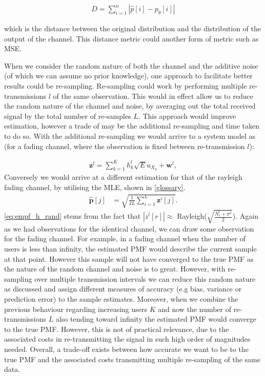 \documentclass{article}
\begin{document}
\begin{align}
    D = \sum_{i=1}^n |\hat{p}[i] - p_{\theta}[i]|
\end{align}

which is the distance between the original distribution and the distribution of the output of the channel. This distance metric could another form of metric such as \ac{MSE}. 

When we consider the random nature of both the channel and the additive noise (of which we can assume no prior knowledge), one approach to facilitate better results could be re-sampling. Re-sampling could work by performing multiple re-transmissions $l$ of the same observation. This would in effect allow us to reduce the random nature of the channel and noise, by averaging out the total received signal by the total number of re-samples $L$. This approach would improve estimation, however a trade of may be the additional re-sampling and time taken to do so. With the additional re-sampling we would arrive to a system model as (for a fading channel, where the observation is fixed between re-transmission $l$):

\begin{align}
    \boldsymbol{z}^l = \sum_{k=1}^K h_k^l  \sqrt{E}u_{X_k} + \boldsymbol{w}^l, \label{eq:system_model_retrans}
\end{align}
Conversely we would arrive at a different estimation for that of the rayleigh fading channel, by utilising the \ac{MLE}, shown in \cref{glossary}.
\begin{align}
    \boldsymbol{\hat{p}}[j] &= \sqrt{\frac{1}{2L} \sum_{i = 1}^{L}\boldsymbol{z}^i[j]}.\label{eq:empf_h_rand}
\end{align}
\cref{eq:empf_h_rand} stems from the fact that $|z^l[r]| \approx$ Rayleigh($\sqrt{\frac{N_{r}^l + \sigma^2}{2}}$). Again as we had observations for the identical channel, we can draw some observation for the fading channel. For example, in a fading channel when the number of users is less than infinity, the estimated \ac{PMF} would describe the current sample at that point. However this sample will not have converged to the true \ac{PMF} as the nature of the random channel and noise is to great. However, with re-sampling over multiple transmission intervals we can reduce this random nature as discussed and assign different measures of accuracy (e.g bias, variance or prediction error) to the sample estimates.
Moreover, when we combine the previous behaviour regarding increasing users $K$ and now the number of re-transmissions $L$ also tending toward infinity the estimated \ac{PMF} would converge to the true \ac{PMF}. However, this is not of practical relevance, due to the associated costs in re-transmitting the signal in such high order of magnitudes needed. Overall, a trade-off exists between how accurate we want to be to the true \ac{PMF} and the associated costs transmitting multiple re-sampling of the same data. 
\end{document}
